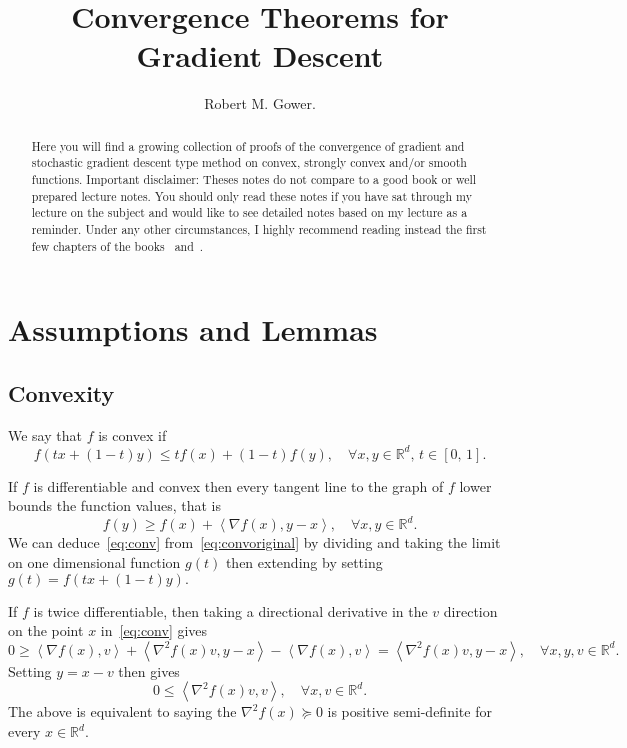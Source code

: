 \documentclass[11pt]{article}
\title{Convergence Theorems for Gradient Descent}
\author{Robert M. Gower.}
\newcommand{\R}{\mathbb{R}}
\newcommand{\EE}[2]{\mathbf{E}_{#1}\left[#2\right] }
\newcommand{\dotprod}[1]{\left< #1\right>}
\newcommand{\rob}[1]{\todo[inline]{\textbf{Robert: }#1}}
\begin{document}
\maketitle
\begin{abstract}Here you will find a growing collection of proofs of the convergence of gradient and stochastic gradient descent type method on convex, strongly convex and/or smooth functions. Important disclaimer: Theses notes do not compare to a good book or well prepared lecture notes. You should only read these notes if you have sat through my lecture on the subject and would like to see detailed notes based on my lecture as a reminder. Under any other circumstances, I highly recommend reading instead the first few chapters of the books~\cite{NesterovBook} and~\cite{Boyd2010}.
\end{abstract}
\section{Assumptions and Lemmas}

\subsection{Convexity}

We say that $f$ is convex if
\begin{equation} \label{eq:convoriginal}
f(tx+(1-t)y) \leq tf(x) + (1-t)f(y), \quad \forall x,y \in \R^d,\, t \in [0,\,1].
\end{equation}

If $f$ is differentiable and convex then every tangent line to the graph of $f$ lower bounds the function values, that is
\begin{equation}\label{eq:conv}
f(y) \geq f(x) + \dotprod{\nabla f(x), y-x}, \quad \forall x,y \in \R^d.
\end{equation}
We can deduce~\eqref{eq:conv} from~\eqref{eq:convoriginal} by dividing and taking the limit on one dimensional function $g(t)$ then extending by setting $g(t) = f(tx+(1-t)y).$

 
If $f$ is twice differentiable, then taking a directional derivative in the $v$ direction on the point $x$ in~\eqref{eq:conv} gives
\begin{equation}\label{eq:convproof}
0 \geq \dotprod{\nabla f(x),v} + \dotprod{\nabla^2 f(x)v, y-x}-\dotprod{\nabla f(x),v} = \dotprod{\nabla^2 f(x)v, y-x}, \quad \forall x,y,v \in \R^d.
\end{equation}
Setting $y =x-v $ then gives
\begin{equation}\label{eq:convhess}
0 \leq \dotprod{\nabla^2 f(x)v, v}, \quad \forall x,v \in \R^d.
\end{equation}
The above is equivalent to saying the $\nabla^2 f(x) \succeq 0$ is positive semi-definite for every $x \in \R^d.$
\end{document}
